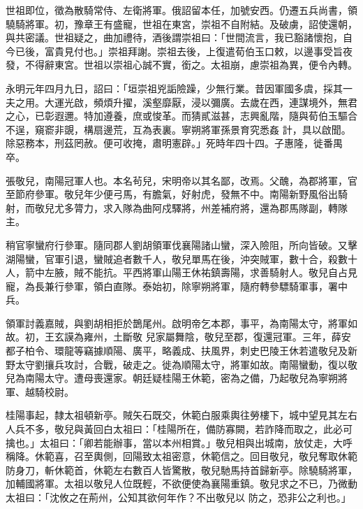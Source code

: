\begin{pinyinscope}
 世祖即位，徵為散騎常侍、左衛將軍。俄詔留本任，加號安西。仍遷五兵尚書，領驍騎將軍。初，豫章王有盛寵，世祖在東宮，崇祖不自附結。及破虜，詔使還朝，與共密議。世祖疑之，曲加禮待，酒後謂崇祖曰：「世間流言，我已豁諸懷抱，自今已後，富貴見付也。」崇祖拜謝。崇祖去後，上復遣荀伯玉口敕，以邊事受旨夜發，不得辭東宮。世祖以崇祖心誠不實，銜之。太祖崩，慮崇祖為異，便令內轉。



 永明元年四月九日，詔曰：「垣崇祖兇詬險躁，少無行業。昔因軍國多虞，採其一夫之用。大運光啟，頻煩升擢，溪壑靡厭，浸以彌廣。去歲在西，連謀境外，無君之心，已彰遐邇。特加遵養，庶或悛革。而猜貳滋甚，志興亂階，隨與荀伯玉驅合不逞，窺窬非覬，構扇邊荒，互為表裏。寧朔將軍孫景育究悉姦
 計，具以啟聞。除惡務本，刑茲罔赦。便可收掩，肅明憲辟。」死時年四十四。子惠隆，徙番禺卒。



 張敬兒，南陽冠軍人也。本名茍兒，宋明帝以其名鄙，改焉。父醜，為郡將軍，官至節府參軍。敬兒年少便弓馬，有膽氣，好射虎，發無不中。南陽新野風俗出騎射，而敬兒尤多膂力，求入隊為曲阿戍驛將，州差補府將，還為郡馬隊副，轉隊主。



 稍官寧蠻府行參軍。隨同郡人劉胡領軍伐襄陽諸山蠻，深入險阻，所向皆破。又擊湖陽蠻，官軍引退，蠻賊追者數千人，敬兒單馬在後，沖突賊軍，數十合，殺數十人，箭中左腋，賊不能抗。平西將軍山陽王休祐鎮壽陽，求善騎射人。敬兒自占見寵，為長兼行參軍，領白直隊。泰始初，除寧朔將軍，隨府轉參驃騎軍事，署中兵。



 領軍討義嘉賊，與劉胡相拒於鵲尾州。啟明帝乞本郡，事平，為南陽太守，將軍如故。初，王玄謨為雍州，土斷敬
 兒家屬舞陰，敬兒至郡，復還冠軍。三年，薛安都子柏令、環龍等竊據順陽、廣平，略義成、扶風界，刺史巴陵王休若遣敬兒及新野太守劉攘兵攻討，合戰，破走之。徙為順陽太守，將軍如故。南陽蠻動，復以敬兒為南陽太守。遭母喪還家。朝廷疑桂陽王休範，密為之備，乃起敬兒為寧朔將軍、越騎校尉。



 桂陽事起，隸太祖頓新亭。賊矢石既交，休範白服乘輿往勞樓下，城中望見其左右人兵不多，敬兒與黃回白太祖曰：「桂陽所在，備防寡闕，若詐降而取之，此必可擒也。」太祖曰：「卿若能辦事，當以本州相賞。」敬兒相與出城南，放仗走，大呼稱降。休範喜，召至輿側，回陽致太祖密意，休範信之。回目敬兒，敬兒奪取休範防身刀，斬休範首，休範左右數百人皆驚散，敬兒馳馬持首歸新亭。除驍騎將軍，加輔國將軍。太祖以敬兒人位既輕，不欲便使為襄陽重鎮。敬兒求之不已，乃微動太祖曰：「沈攸之在荊州，公知其欲何年作？不出敬兒以
 防之，恐非公之利也。」




\end{pinyinscope}
